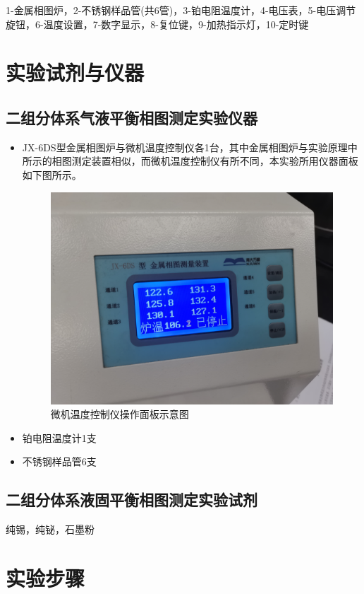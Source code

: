 \documentclass[12pt,hyperref,a4paper,UTF8]{ctexart}
\begin{document}
1-金属相图炉，2-不锈钢样品管(共6管)，3-铂电阻温度计，4-电压表，5-电压调节旋钮，6-温度设置，7-数字显示，8-复位键，9-加热指示灯，10-定时键


\section{实验试剂与仪器}
\subsection{二组分体系气液平衡相图测定实验仪器}
\begin{itemize}
    \item JX-6DS型金属相图炉与微机温度控制仪各1台，其中金属相图炉与实验原理中所示的相图测定装置相似，而微机温度控制仪有所不同，本实验所用仪器面板如下图所示。
    \begin{figure}[htp]
        \centering
        \includegraphics[width=0.5\linewidth]{WechatIMG631.jpg}
        \caption{微机温度控制仪操作面板示意图}
        \label{fig:enter-label7}
    \end{figure}
    \item 铂电阻温度计1支
    \item 不锈钢样品管6支
    
\end{itemize}

\subsection{二组分体系液固平衡相图测定实验试剂}
纯锡，纯铋，石墨粉

\section{实验步骤}
\end{document}
